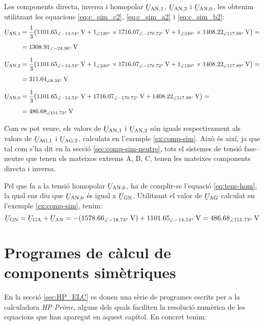 \begin{exemple}
    Les components directa, inversa i homopolar $\cmplx{U}\ped{AN,1}$, $\cmplx{U}\ped{AN,2}$ i
    $\cmplx{U}\ped{AN,0}$, les obtenim utilitzant les equacions
    \eqref{eq:c_sim_c2}, \eqref{eq:c_sim_a2} i \eqref{eq:c_sim_b2}:
    \begin{align*}
        \cmplx{U}\ped{AN,1} &= \frac{1}{3} \big(
        \SIpd{1101,65}{-14,54}{V} + \numpd{1}{120} \times \SIpd{1716,07}{-170,72}{V} +
        \numpd{1}{240} \times \SIpd{1408,22}{117,89}{V} \big) =\\[1ex]
        &= \SIpd{1308,91}{-24,96}{V} \\[1.5ex]
        \cmplx{U}\ped{AN,2} &= \frac{1}{3} \big(
        \SIpd{1101,65}{-14,54}{V} + \numpd{1}{240} \times \SIpd{1716,07}{-170,72}{V} +
        \numpd{1}{120} \times \SIpd{1408,22}{117,89}{V} \big) =\\[1ex]
        &= \SIpd{311,64}{8,34}{V} \\[1.5ex]
        \cmplx{U}\ped{AN,0} &= \frac{1}{3} \big(
        \SIpd{1101,65}{-14,54}{V} + \SIpd{1716,07}{-170,72}{V} + \SIpd{1408,22}{117,89}{V} \big) = \\[1ex]
        &= \SIpd{486,68}{151,73}{V}
    \end{align*}

    Com es pot veure, els valors de $\cmplx{U}\ped{AN,1}$ i $\cmplx{U}\ped{AN,2}$ són iguals respectivament als valors de $\cmplx{U}\ped{AG,1}$ i $\cmplx{U}\ped{AG,2}$, calculats en l'exemple \ref{ex:comp-sim}.
    Això és així, ja que tal com s'ha dit en la secció \vref{sec:comp-sim-neutre}, tots el sistemes de tensió fase–neutre que tenen els mateixos extrems A, B, C, tenen les mateixes components directa i inversa.

    Pel que fa a la tensió homopolar $\cmplx{U}\ped{AN,0}$, ha de complir-se l'equació \eqref{eq:tens-hom}, la qual ens diu que $\cmplx{U}\ped{AN,0}$ és igual a $\cmplx{U}\ped{GN}$. Utilitzant el valor de  $\cmplx{U}\ped{AG}$ calculat en l'exemple \ref{ex:comp-sim}, tenim:
    \[
        \cmplx{U}\ped{GN} = \cmplx{U}\ped{GA} + \cmplx{U}\ped{AN} = -(\SIpd{1578,66}{-18,74}{V}) +
        \SIpd{1101,65}{-14,54}{V} = \SIpd{486,68}{151,73}{V}
    \]
\end{exemple}

\section{Programes de càlcul de components simètriques}\label{sec:calcul-comp-sim}

En la secció \vref{sec:HP_ELC} es donen  una sèrie de programes escrits per a la calculadora \emph{HP Prime},
 alguns dels quals faciliten la resolució numèrica de les equacions que han aparegut en aquest capítol. En concret tenim:

